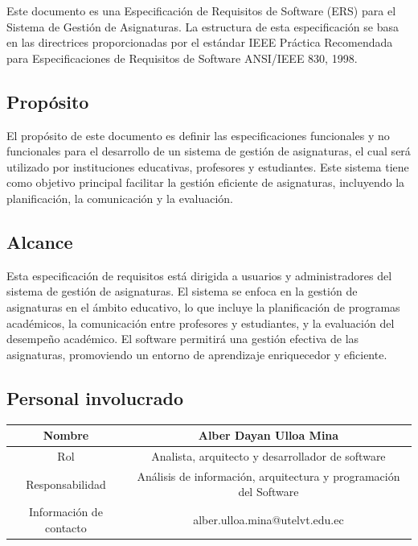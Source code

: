 \documentclass[11pt]{article}
\begin{document}
Este documento es una Especificación de Requisitos de Software (ERS)
para el Sistema de Gestión de Asignaturas. La estructura de esta 
especificación se basa en las directrices proporcionadas por el
estándar IEEE Práctica Recomendada para Especificaciones de 
Requisitos de Software ANSI/IEEE 830, 1998.

\subsection{\textbf{Propósito}}

El propósito de este documento es definir las especificaciones 
funcionales y no funcionales para el desarrollo de un sistema de
gestión de asignaturas, el cual será utilizado por instituciones
educativas, profesores y estudiantes. Este sistema tiene como
objetivo principal facilitar la gestión eficiente de asignaturas,
incluyendo la planificación, la comunicación y la evaluación.

\subsection{\textbf{Alcance}}

Esta especificación de requisitos está dirigida a usuarios y 
administradores del sistema de gestión de asignaturas. El sistema se 
enfoca en la gestión de asignaturas en el ámbito educativo, lo que 
incluye la planificación de programas académicos, la comunicación 
entre profesores y estudiantes, y la evaluación del desempeño 
académico. El software permitirá una gestión efectiva de las 
asignaturas, promoviendo un entorno de aprendizaje enriquecedor y 
eficiente.
\subsection{\textbf{Personal involucrado}}
\vspace{10pt}

\begin{tabular}{|c|c|}

\hline
Nombre & Alber Dayan Ulloa Mina  \\
\hline
Rol & Analista, arquitecto y desarrollador de software \\
\hline
Responsabilidad & Análisis de información, arquitectura y programación del Software  \\
\hline
Información de contacto & alber.ulloa.mina@utelvt.edu.ec \\
\hline

\end{tabular}
\end{document}
